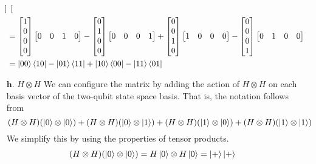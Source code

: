 \documentclass[11pt]{article}
\begin{document}
\begin{enumerate}
\begin{align*}
\begin{bmatrix}
                    \end{bmatrix} \\
                    &= \begin{bmatrix}1 \\ 0 \\ 0 \\ 0\end{bmatrix}
                       \begin{bmatrix}0 & 0 & 1 & 0\end{bmatrix} -
                       \begin{bmatrix}0 \\ 1 \\ 0 \\ 0\end{bmatrix}
                       \begin{bmatrix}0 & 0 & 0 & 1\end{bmatrix} +
                       \begin{bmatrix}0 \\ 0 \\ 1 \\ 0\end{bmatrix}
                       \begin{bmatrix}1 & 0 & 0 & 0\end{bmatrix} -
                       \begin{bmatrix}0 \\ 0 \\ 0 \\ 1\end{bmatrix}
                       \begin{bmatrix}0 & 1 & 0 & 0\end{bmatrix} \\
                    &= \ket{00}\bra{10} - \ket{01}\bra{11} + \ket{10}\bra{00} - \ket{11}\bra{01} 
    \end{align*}
\newpage
    \item[$\textbf{h.}$] $H \otimes H$ 
        We can configure the matrix by adding the action of $H \otimes H$ on each basis vector of the two-qubit state space basis.
        That is, the notation follows from $$(H \otimes H)(\ket{0} \otimes \ket{0}) + (H \otimes H)(\ket{0} \otimes \ket{1}) + (H \otimes H)(\ket{1} \otimes \ket{0})
        + (H \otimes H)(\ket{1} \otimes \ket{1})$$
        We simplify this by using the properties of tensor products.
        \begin{align*}
            (H \otimes H)(\ket{0} \otimes \ket{0}) &= H\ket{0} \otimes H\ket{0} = \ket{+}\ket{+} \\

\end{align*}
\end{enumerate}
\end{document}

